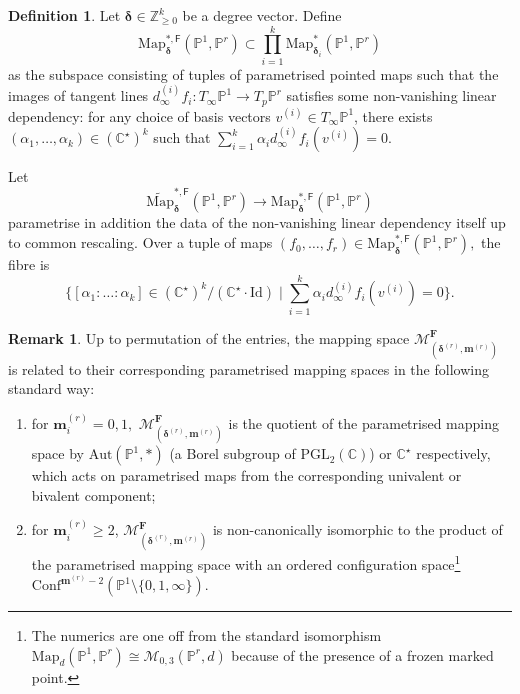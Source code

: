 \documentclass[12pt,reqno]{amsart}
\theoremstyle{definition}
\theoremstyle{definition}
\theoremstyle{definition}
\theoremstyle{definition}
\newtheorem{remark}[theorem]{Remark}
\newtheorem{definition}[theorem]{Definition}
\begin{document}
\begin{definition}\label{defn:MapF}
Let $\boldsymbol{\delta}\in \mathbb{Z}_{\geq 0}^k$ be a degree vector. Define $$\mathrm{Map}_{\boldsymbol{\delta}}^{*, \mathsf{F}}(\mathbb{P}^1, \mathbb{P}^r)\subset \prod_{i=1}^k \mathrm{Map}_{\boldsymbol{\delta}_i}^{*}(\mathbb{P}^1, \mathbb{P}^r)$$ as the subspace consisting of tuples of parametrised pointed maps such that the images of tangent lines \(d_\infty^{(i)}f_i: T_{\infty} \mathbb{P}^1\to T_p \mathbb{P}^r\) satisfies some non-vanishing linear dependency: for any choice of basis vectors \(v^{(i)}\in T_\infty \mathbb{P}^1\), there exists \((\alpha_1,\dots, \alpha_k)\in (\mathbb{C}^\star)^{k}\) such that \(\sum_{i=1}^k \alpha_i d_\infty^{(i)}f_i(v^{(i)})=0.\)

Let \[\widetilde{\mathrm{Map}}_{\boldsymbol{\delta}}^{*, \mathsf{F}}(\mathbb{P}^1, \mathbb{P}^r)\to \mathrm{Map}_{\boldsymbol{\delta}}^{*, \mathsf{F}}(\mathbb{P}^1, \mathbb{P}^r)\] parametrise in addition the data of the non-vanishing linear dependency itself up to common rescaling. Over a tuple of maps $(f_0,\dots, f_r)\in \mathrm{Map}_{\boldsymbol{\delta}}^{*, \mathsf{F}}(\mathbb{P}^1, \mathbb{P}^r),$ the fibre is $$\{[\alpha_1:\dots:\alpha_k]\in (\mathbb{C}^\star)^{k}/(\mathbb{C}^\star\cdot \mathrm{Id})\mid \sum_{i=1}^k \alpha_i d_\infty^{(i)}f_i(v^{(i)})=0\}.$$
\end{definition}

\begin{remark}\label{rem:parunpar}
  Up to permutation of the entries, the mapping space $\mathcal{M}^{\mathbf{F}}_{(\boldsymbol{\delta}^{(r)}, \boldsymbol{m}^{(r)})}$ is related to their corresponding parametrised mapping spaces in the following standard way:
  \begin{enumerate}
    \item for $\boldsymbol{m}_i^{(r)} = 0,1,$ $\mathcal{M}^{\mathbf{F}}_{(\boldsymbol{\delta}^{(r)}, \boldsymbol{m}^{(r)})}$ is the quotient of the parametrised mapping space by $\mathrm{Aut}(\mathbb{P}^1, *)$ (a Borel subgroup of $\mathrm{PGL}_2(\mathbb{C})$) or $\mathbb{C}^\star$ respectively, which acts on parametrised maps from the corresponding univalent or bivalent component;
    \item for $\boldsymbol{m}^{(r)}_i\geq 2$,  $\mathcal{M}^{\mathbf{F}}_{(\boldsymbol{\delta}^{(r)}, \boldsymbol{m}^{(r)})}$ is non-canonically isomorphic to the product of the parametrised mapping space with an ordered configuration space\footnote{The numerics are one off from the standard isomorphism $\mathrm{Map}_d (\mathbb{P}^1,\mathbb{P}^r)\cong \mathcal{M}_{0,3}(\mathbb{P}^r,d)$ because of the presence of a frozen marked point.} $\mathrm{Conf}^{\boldsymbol{m}^{(r)}-2}(\mathbb{P}^1\setminus \{0,1,\infty\}).$
  \end{enumerate}
\end{remark}
\end{document}
